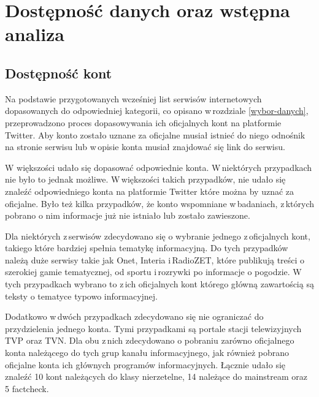 \newpage
\section{Dostępność danych oraz wstępna analiza}
\subsection{Dostępność kont }
Na podstawie przygotowanych wcześniej list serwisów internetowych dopasowanych do odpowiedniej kategorii, co opisano w\,rozdziale \ref{wybor-danych}, przeprowadzono proces dopasowywania ich oficjalnych kont na platformie Twitter. Aby konto zostało uznane za oficjalne musiał istnieć do niego odnośnik na stronie serwisu lub w\,opisie konta musiał znajdować się link do serwisu. 
\par
W większości udało się dopasować odpowiednie konta. W\,niektórych przypadkach nie było to jednak możliwe. W\,większości takich przypadków, nie udało się znaleźć odpowiedniego konta na platformie Twitter które można by uznać za oficjalne. Było też kilka przypadków, że konto wspomniane w\,badaniach, z\,których pobrano o nim informacje już nie istniało lub zostało zawieszone.
\par
Dla niektórych z\,serwisów zdecydowano się o wybranie jednego z\,oficjalnych kont, takiego które bardziej spełnia tematykę informacyjną. Do tych przypadków należą duże serwisy takie jak Onet, Interia i\,RadioZET, które publikują treści o szerokiej gamie tematycznej, od sportu i\,rozrywki po informacje o pogodzie.  W\,tych przypadkach wybrano to z\,ich oficjalnych kont którego główną zawartością są teksty o tematyce typowo informacyjnej. 
\par
Dodatkowo w\,dwóch przypadkach zdecydowano się nie ograniczać do przydzielenia jednego konta. Tymi przypadkami są portale stacji telewizyjnych TVP oraz TVN. Dla obu z\,nich zdecydowano o pobraniu zarówno oficjalnego konta należącego do tych grup kanału informacyjnego, jak również pobrano oficjalne konta ich głównych programów informacyjnych. 
Łącznie udało się znaleźć 10 kont należących do klasy nierzetelne, 14 należące do mainstream oraz 5 factcheck.

